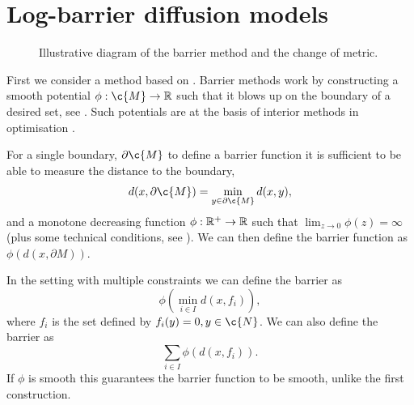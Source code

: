 \section{Log-barrier diffusion models}
\label{sec:bsgm}

\begin{figure}[h]
	\begin{minipage}[b]{0.49\textwidth}
		\centering
		
		\caption{Convergence of the barrier Langevin dynamics on the unit interval to the uniform distribution.}
		\label{fig:density}
	\end{minipage}
	\hfill
	\begin{minipage}[b]{0.49\textwidth}
		\centering
		\vspace{2.7em}
		\caption{
			Illustrative diagram of the barrier method and the change of metric.
		}
	\end{minipage}
\end{figure}

First we consider a method based on .
Barrier methods work by constructing a smooth potential \(\phi: \c{M} \rightarrow \R\) such that it blows up on the boundary of a desired set, see \textcite{nesterov2018lectures}.
Such potentials are at the basis of interior methods in optimisation \parencite{boyd2004convex}.

For a single boundary, \(\partial \c{M}\) to define a barrier function it is sufficient to be able to measure the distance to the boundary, \[d(x, \partial \c{M}) = \min_{y\in \partial \c{M}} d(x, y),\] and a monotone decreasing function \(\phi: \mathbb{R}^+ \to \mathbb{R}\) such that \(\lim_{z \rightarrow 0} \phi(z) = \infty\) (plus some technical conditions, see \cite{nesterov1994interior}).
We can then define the barrier function as \(\phi(d(x, \partial{M}))\).

In the setting with multiple constraints we can define the barrier as 
\[\phi(\min_{i\in I} d(x, f_i)), \]
where \(f_i\) is the set defined by \(f_i(y) = 0, y\in \c{N}\).
We can also define the barrier as 
\[\sum_{i\in I} \phi(d(x, f_i)).\]
If \(\phi\) is smooth this guarantees the barrier function to be smooth, unlike the first construction.

